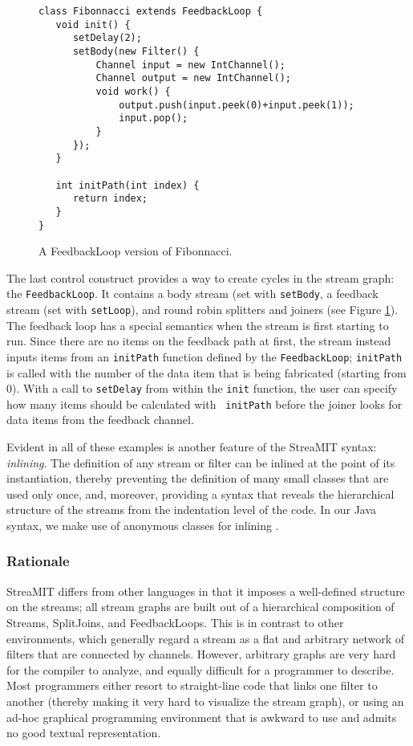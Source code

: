 \begin{figure}
\scriptsize
\begin{verbatim}
class Fibonnacci extends FeedbackLoop {
   void init() {
      setDelay(2);
      setBody(new Filter() {
          Channel input = new IntChannel();
          Channel output = new IntChannel();
          void work() {
              output.push(input.peek(0)+input.peek(1));
              input.pop();
          }
      });
   }

   int initPath(int index) {
      return index;
   }
}
\end{verbatim}
\vspace{-12pt}
\caption{\protect\small A FeedbackLoop version of Fibonnacci.
\protect\label{fig:feed}}
\vspace{-12pt}
\end{figure}

The last control construct provides a way to create cycles in the
stream graph: the {\tt FeedbackLoop}.  It contains a body stream (set
with {\tt setBody}, a feedback stream (set with {\tt setLoop}), and
round robin splitters and joiners (see Figure \ref{fig:feed}).  The
feedback loop has a special semantics when the stream is first
starting to run.  Since there are no items on the feedback path at
first, the stream instead inputs items from an {\tt initPath} function
defined by the {\tt FeedbackLoop}; {\tt initPath} is called with the
number of the data item that is being fabricated (starting from 0).
With a call to {\tt setDelay} from within the {\tt init} function, the
user can specify how many items should be calculated with {\tt
initPath} before the joiner looks for data items from the feedback
channel.

Evident in all of these examples is another feature of the StreaMIT
syntax: {\it inlining}.  The definition of any stream or filter can be
inlined at the point of its instantiation, thereby preventing the
definition of many small classes that are used only once, and,
moreover, providing a syntax that reveals the hierarchical structure
of the streams from the indentation level of the code.  In our Java
syntax, we make use of anonymous classes for inlining \cite{java}.

\subsubsection{Rationale}

StreaMIT differs from other languages in that it imposes a
well-defined structure on the streams; all stream graphs are built out
of a hierarchical composition of Streams, SplitJoins, and
FeedbackLoops.  This is in contrast to other environments, which
generally regard a stream as a flat and arbitrary network of filters
that are connected by channels.  However, arbitrary graphs are very
hard for the compiler to analyze, and equally difficult for a
programmer to describe.  Most programmers either resort to
straight-line code that links one filter to another (thereby making it
very hard to visualize the stream graph), or using an ad-hoc graphical
programming environment that is awkward to use and admits no good
textual representation.

